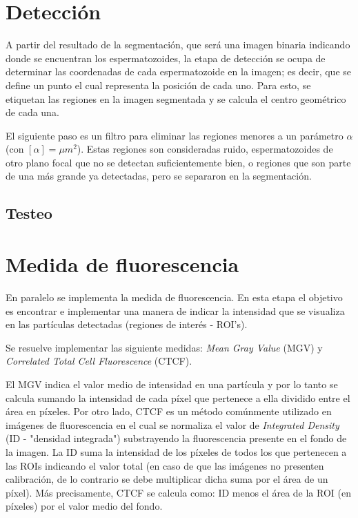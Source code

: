 \section{Detección}
A partir del resultado de la segmentación, que será una imagen binaria indicando donde se encuentran los espermatozoides, la etapa de detección se ocupa de determinar las coordenadas de cada espermatozoide en la imagen; es decir, que se define un punto el cual representa la posición de cada uno. Para esto, se etiquetan las regiones en la imagen segmentada y se calcula el centro geométrico de cada una.

El siguiente paso es un filtro para eliminar las regiones menores a un parámetro $\alpha$ (con $[\alpha]=\mu m ^2$). Estas regiones son consideradas ruido, espermatozoides de otro plano focal que no se detectan suficientemente bien, o regiones que son parte de una más grande ya detectadas, pero se separaron en la segmentación.

\subsection{Testeo}



\section{Medida de fluorescencia}
En paralelo se implementa la medida de fluorescencia. En esta etapa el objetivo es encontrar e implementar una manera de indicar la intensidad que se visualiza en las partículas detectadas (regiones de interés - ROI's).


Se resuelve implementar las siguiente medidas: \textit{Mean Gray Value} (MGV)  y \textit{Correlated Total Cell Fluorescence} (CTCF). 


El MGV indica el valor medio de intensidad en una partícula y por lo tanto se calcula sumando la intensidad de cada píxel que pertenece a ella dividido entre el área en píxeles. Por otro lado, CTCF es un método comúnmente utilizado en imágenes de fluorescencia en el cual se normaliza el valor de \textit{Integrated Density} (ID - "densidad integrada") substrayendo la fluorescencia presente en el fondo de la imagen. La ID suma la intensidad de los píxeles de todos los que pertenecen a las ROIs indicando el valor total (en caso de que las imágenes no presenten calibración, de lo contrario se debe multiplicar dicha suma por el área de un píxel). Más precisamente, CTCF se calcula como: ID menos el área de la ROI (en píxeles) por el valor medio del fondo.


